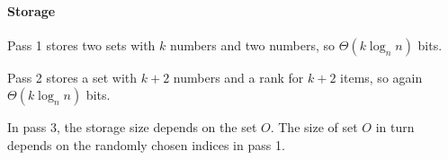 \paragraph{Storage}
Pass 1 stores two sets with $k$ numbers and two numbers, so $\Theta(k\log_n{n})$ bits.

Pass 2 stores a set with $k+2$ numbers and a rank for $k+2$ items, so again $\Theta(k\log_n{n})$ bits.

In pass 3, the storage size depends on the set $O$.
The size of set $O$ in turn depends on the randomly chosen indices in pass 1.
